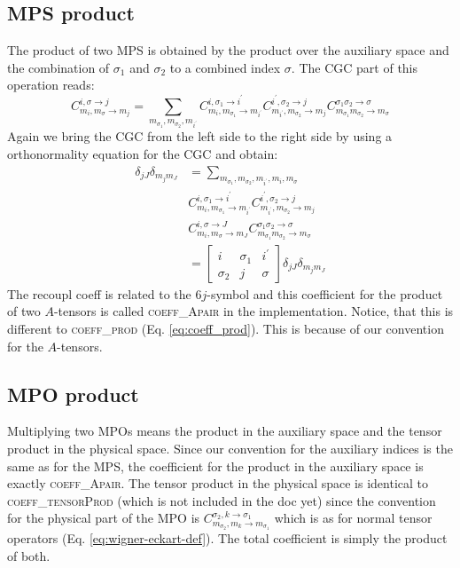 \documentclass[a4paper,10pt,parskip=full]{scrartcl}
\begin{document}
\subsection{MPS product}
The product of two MPS is obtained by the product over the auxiliary space and the combination
of $\sigma_1$ and $\sigma_2$ to a combined index $\sigma$.
The CGC part of this operation reads:
\begin{equation}
  C^{i,\sigma\rightarrow j}_{m_i,m_{\sigma}\rightarrow m_{j}}=
  \sum_{m_{\sigma_1},m_{\sigma_2},m_{i^\prime}}
  C^{i,\sigma_1\rightarrow i^\prime}_{m_i,m_{\sigma_1}\rightarrow m_{i^\prime}}
  C^{i^\prime,\sigma_2\rightarrow j}_{m_{i^\prime},m_{\sigma_2}\rightarrow m_{j}}
  C^{\sigma_1\sigma_2\rightarrow\sigma}_{m_{\sigma_1}m_{\sigma_2}\rightarrow m_{\sigma}}
\end{equation}
Again we bring the CGC from the left side to the right side by using a orthonormality equation for the CGC
and obtain:
\begin{equation}
  \begin{split}
    \delta_{jJ}\delta_{m_jm_J}&=
    \sum_{m_{\sigma_1},m_{\sigma_2},m_{i^\prime},m_i,m_{\sigma}}\\
    &C^{i,\sigma_1\rightarrow i^\prime}_{m_i,m_{\sigma_1}\rightarrow m_{i^\prime}}
    C^{i^\prime,\sigma_2\rightarrow j}_{m_{i^\prime},m_{\sigma_2}\rightarrow m_{j}}\\
    &C^{i,\sigma\rightarrow J}_{m_i,m_{\sigma}\rightarrow m_{J}}
    C^{\sigma_1\sigma_2\rightarrow\sigma}_{m_{\sigma_1}m_{\sigma_2}\rightarrow m_{\sigma}}\\
    &=
    \begin{bmatrix}
      i & \sigma_1 & i^\prime \\
      \sigma_2 & j & \sigma
    \end{bmatrix}\delta_{jJ}\delta_{m_jm_J}
  \end{split}
\end{equation}
The recoupl coeff is related to the $6j$-symbol and this coefficient
for the product of two $A$-tensors is called \textsc{coeff\_Apair}
in the implementation. Notice, that this is different to \textsc{coeff\_prod} (Eq. \eqref{eq:coeff_prod}).
This is because of our convention for the $A$-tensors.
\subsection{MPO product}
Multiplying two MPOs means the product in the auxiliary space and the tensor product in the
physical space. Since our convention for the auxiliary indices is the same as for the MPS,
the coefficient for the product in the auxiliary space is exactly \textsc{coeff\_Apair}.
The tensor product in the physical space is identical to \textsc{coeff\_tensorProd}
(which is not included in the doc yet)
since the convention for the physical part of the MPO is $C^{\sigma_2,k\rightarrow\sigma_1}_{m_{\sigma_2},m_k\rightarrow m_{\sigma_1}}$
which is as for normal tensor operators (Eq. \eqref{eq:wigner-eckart-def}).
The total coefficient is simply the product of both.
\end{document}
